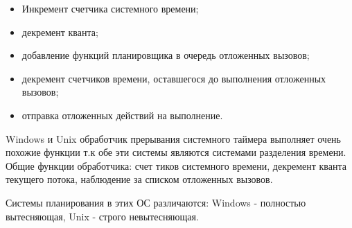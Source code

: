 \documentclass[12pt]{report}
\begin{document}
\begin{itemize}
	\item Инкремент счетчика системного времени;
	\item декремент кванта;
	\item добавление функций планировщика в очередь отложенных вызовов;
	\item декремент счетчиков времени, оставшегося до выполнения отложенных вызовов;
	\item отправка отложенных действий на выполнение.
\end{itemize}
Windows и Unix обработчик прерывания системного таймера выполняет очень похожие функции т.к обе эти системы являются системами разделения времени. Общие функции обработчика: счет тиков системного времени, декремент кванта текущего потока, наблюдение за списком отложенных вызовов.

Системы планирования в этих ОС различаются: Windows - полностью вытесняющая, Unix - строго невытесняющая.
\end{document}
